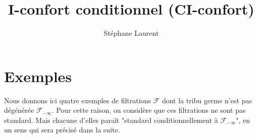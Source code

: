 \documentclass[12pt,a4paper]{article}
\author{Stéphane Laurent}
\title{I-confort conditionnel (CI-confort)}
\begin{document}
\theoremstyle{defstyle}
\newtheorem{definition}{Definition}
\newtheorem{remark}{Remark}
\newtheorem{question}{Question}
\newtheorem{clarify}{To clarify}
\newtheorem{remarque}{Remarque}
\newtheorem{exemple}{Exemple}

\theoremstyle{thmstyle}
\newtheorem{thm}{Theorem}[section]
\newtheorem{ppsition}{Proposition}
\newtheorem{lemma}{Lemma}
\newtheorem{lemme}{Lemme}

\renewcommand{\AA}{\mathcal{A}}
\newcommand{\BB}{\mathcal{B}}
\newcommand{\CC}{\mathcal{C}}
\newcommand{\EEE}{\mathcal{E}}
\newcommand{\FF}{\mathcal{F}}
\newcommand{\GG}{\mathcal{G}}
\newcommand{\EE}{\mathbb{E}}
\newcommand{\HH}{\mathcal{H}}
\newcommand{\II}{\mathcal{I}}
\newcommand{\LL}{\mathcal{L}}
\newcommand{\OO}{\mathcal{O}}
\newcommand{\PP}{\mathbb{P}}
\newcommand{\XX}{\mathcal{X}}
\newcommand{\given}{\mid}
\newcommand{\biggiven}{\,\big\vert\,}
\newcommand{\eps}{\epsilon}
\newcommand{\indic}{\boldsymbol 1}
\newcommand{\Vb}{\boldsymbol V}
\newcommand{\tildV}{\widetilde{V}}

\newcommand{\indvee}{\dot{\vee}}
\newcommand{\indep}{\mathrel{\text{\scalebox{1.07}{$\perp\mkern-10mu\perp$}}}}

\newcommand{\disp}{\textrm{disp}}

\maketitle

\section{Exemples}

Nous donnons ici quatre exemples de filtrations $\FF$ dont la tribu germe 
n'est pas dégénérée $\FF_{-\infty}$. 
Pour cette raison, on considère que ces filtrations ne sont pas standard. 
Mais chacune d'elles para\^it "standard conditionnellement à $\FF_{-\infty}$", 
en un sens qui sera précisé dans la suite. 
\end{document}
